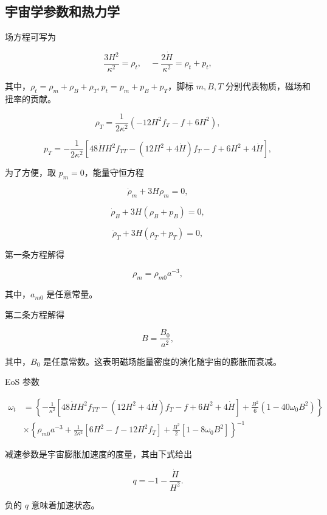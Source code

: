 \documentclass[9pt, dvipsnames]{beamer} %
\begin{document}
\subsection{宇宙学参数和热力学}

\begin{frame}
    场方程可写为

    $$
    \frac{3 H^2 }{\kappa^2 } = \rho_t,\quad
    -\frac{2\dot{H} }{\kappa^2 }  = \rho_t + p_t,
    $$
    
    其中，$\rho_t=\rho_m+\rho_B+\rho_T,p_t=p_m+p_B+p_T$，脚标 $m,B,T$ 分别代表物质，磁场和扭率的贡献。

    $$
    \rho_T = \frac{1 }{2\kappa^2 } \left(-12 H^2 f_T - f + 6H^2 \right),
    $$

    $$
    p_T = -\frac{1 }{2\kappa^2 } \left[48\dot{H}H^2 f_{TT} - \left(12 H^2 + 4\dot{H} \right) f_T - f + 6 H^2 + 4\dot{H} \right],
    $$

    为了方便，取 $p_m=0$，能量守恒方程

    $$
    \dot{\rho}_m + 3H \rho_m = 0,
    $$

    $$
    \dot{\rho}_B + 3H\left(\rho_B + p_B \right) = 0,
    $$

    $$
    \dot{\rho}_T + 3H\left(\rho_T + p_T \right) = 0,
    $$

\end{frame}

\begin{frame}
    第一条方程解得

    $$
    \rho_m = \rho_{m0} a^{-3},
    $$

    其中，$a_{m0}$ 是任意常量。

    第二条方程解得

    $$
    B=\frac{B_0}{a^2},
    $$

    其中，$B_0$ 是任意常数。这表明磁场能量密度的演化随宇宙的膨胀而衰减。

    EoS 参数

    $$
    \begin{aligned}
        \omega_t
        &=\left\{-\frac{1 }{\kappa^2 } \left[48\dot{H}H^2 f_{TT} - \left(12 H^2 + 4\dot{H} \right) f_T - f + 6 H^2 + 4\dot{H} \right] + \frac{B^2 }{6 } \left(1-40\omega_0 B^2 \right) \right\} \\
        &\times \left\{\rho_{m0} a^{-3} + \frac{1 }{2\kappa^2 } \left[6 H^2 - f-12 H^2 f_T \right] + \frac{B^2 }{2 } \left[1-8\omega_0 B^2 \right] \right\}^{-1}
        \end{aligned}
    $$

    减速参数是宇宙膨胀加速度的度量，其由下式给出

    $$
    q = -1 - \frac{\dot{H} }{H^2 } .
    $$

    负的 $q$ 意味着加速状态。

\end{frame}
\end{document}
